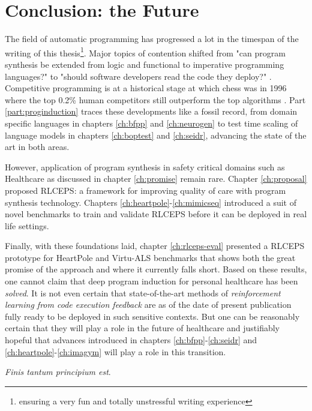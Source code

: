 \chapter{Conclusion: the Future}
\label{ch:conclusion}

The field of automatic programming has progressed a lot in the timespan of the writing of this thesis\footnote{ensuring a very fun and totally unstressful writing experience}.
Major topics of contention shifted from "can program synthesis be extended from logic and functional to imperative programming languages?" \cite{polikarpovaStructuringSynthesisHeapmanipulating2019} to "should software developers read the code they deploy?" \cite{andrejkarpathy[@karpathy]TheresNewKind2025}.
Competitive programming is at a historical stage at which chess was in 1996 \cite{pandolfiniKasparovDeepBlue1997} where the top 0.2\% human competitors still outperform the top algorithms \cite{openaiCompetitiveProgrammingLarge2025}.
Part \ref{part:proginduction} traces these developments like a fossil record, from domain specific languages in chapters \ref{ch:bfpp} and \ref{ch:neurogen} to test time scaling of language models in chapters \ref{ch:boptest} and \ref{ch:seidr}, advancing the state of the art in both areas.

However, application of program synthesis in safety critical domains such as Healthcare as discussed in chapter \ref{ch:promise} remain rare.
Chapter \ref{ch:proposal} proposed RLCEPS: a framework for improving quality of care with program synthesis technology.
Chapters \ref{ch:heartpole}-\ref{ch:mimicseq} introduced a suit of novel benchmarks to train and validate RLCEPS before it can be deployed in real life settings.

Finally, with these foundations laid, chapter \ref{ch:rlceps-eval} presented a RLCEPS prototype for HeartPole and Virtu-ALS benchmarks that shows both the great promise of the approach and where it currently falls short.
Based on these results, one cannot claim that deep program induction for personal healthcare has been \emph{solved}.
It is not even certain that state-of-the-art methods of \emph{reinforcement learning from code execution feedback} are as of the date of present publication fully ready to be deployed in such sensitive contexts.
But one can be reasonably certain that they will play a role in the future of healthcare and justifiably hopeful that advances introduced in chapters \ref{ch:bfpp}-\ref{ch:seidr} and \ref{ch:heartpole}-\ref{ch:imagym} will play a role in this transition.

\emph{Finis tantum principium est}.